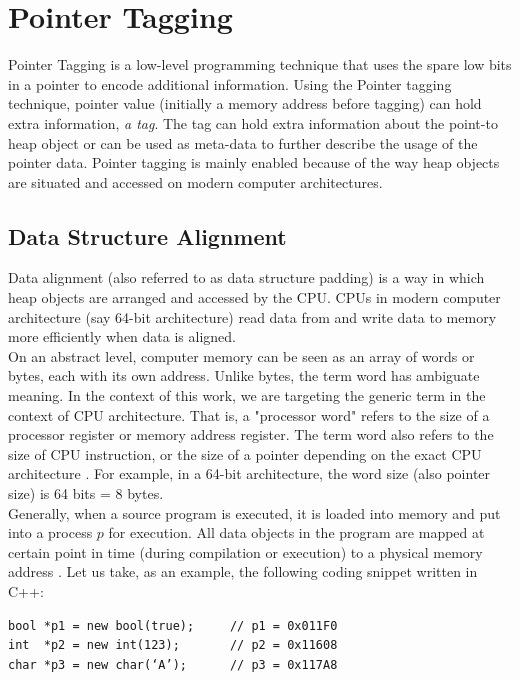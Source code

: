 \section{Pointer Tagging}
\label{sec:preliminaries:pointertagging}

Pointer Tagging \cite{taggedpointer} is a low-level programming technique that uses the spare low bits in a pointer to encode additional information. Using the Pointer tagging technique, pointer value (initially a memory address before tagging) can hold extra information, \textit{a tag}. The tag can hold extra information about the point-to heap object or can be used as meta-data to further describe the usage of the pointer data. Pointer tagging is mainly enabled because of the way heap objects are situated and accessed on modern computer architectures.

\subsection{Data Structure Alignment}
\label{sec:preliminaries:data_alignment}
Data alignment (also referred to as data structure padding) is a way in which heap objects are arranged and accessed by the CPU. CPUs in modern computer architecture (say 64-bit architecture) read data from and write data to memory more efficiently when data is aligned.  \\

On an abstract level, computer memory can be seen as an array of words or bytes, each with its own address. Unlike bytes, the term word has ambiguate meaning. In the context of this work, we are targeting the generic term in the context of CPU architecture. That is, a "processor word" refers to the size of a processor register or memory address register. The term word also refers to the size of CPU instruction, or the size of a pointer depending on the exact CPU architecture \cite{OSConcept}. For example, in a 64-bit architecture, the word size (also pointer size) is 64 bits = 8 bytes.\\

Generally, when a source program is executed, it is loaded into memory and put into a process $p$ for execution. All data objects in the program are mapped at certain point in time (during compilation or execution) to a physical memory address \cite{OSConcept}. Let us take, as an example, the following coding snippet written in C++:

\begin{verbatim}
bool *p1 = new bool(true);     // p1 = 0x011F0
int  *p2 = new int(123);       // p2 = 0x11608
char *p3 = new char(‘A’);      // p3 = 0x117A8
\end{verbatim}

